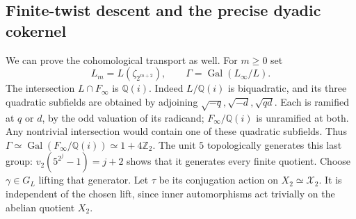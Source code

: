 \subsection{Finite-twist descent and the precise dyadic cokernel}
\label{sec:sr-dyadic-descent}
We can prove the cohomological transport as well.
For \(m\geq0\) set
\[
 L_m=L(\zeta_{2^{m+2}}),\qquad
 \Gamma=\operatorname{Gal}(L_\infty/L).
\]
The intersection \(L\cap F_\infty\) is \(\mathbb Q(i)\).
Indeed \(L/\mathbb Q(i)\) is biquadratic, and its three quadratic
subfields are obtained by adjoining
\(\sqrt{-q},\sqrt{-d},\sqrt{qd}\).
Each is ramified at \(q\) or \(d\), by the odd valuation of its
radicand; \(F_\infty/\mathbb Q(i)\) is unramified at both.
Any nontrivial intersection would contain one of these quadratic
subfields. Thus
\(\Gamma\simeq\operatorname{Gal}(F_\infty/\mathbb Q(i))
\simeq1+4\mathbb Z_2\).
The unit \(5\) topologically generates this last group:
\(v_2(5^{2^j}-1)=j+2\) shows that it generates every finite quotient.
Choose \(\gamma\in G_L\) lifting that generator.
Let \(\tau\) be its conjugation action on \(X_2\simeq\mathcal X_2\).
It is independent of the chosen lift, since inner automorphisms
act trivially on the abelian quotient \(X_2\).

